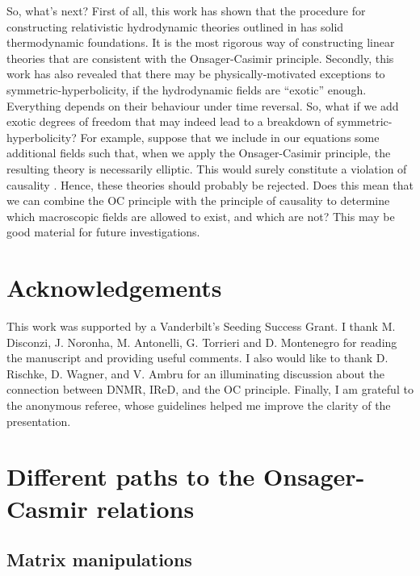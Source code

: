 \documentclass[a4paper, amsfonts, amssymb, amsmath, reprint, showkeys, nofootinbib, twoside, onecolumn,notitlepage]{revtex4-1}
\begin{document}
So, what's next? First of all, this work has shown that the procedure for constructing relativistic hydrodynamic theories outlined in \cite{GavassinoNonHydro2022} has solid thermodynamic foundations. It is the most rigorous way of constructing linear theories that are consistent with the Onsager-Casimir principle. Secondly, this work has also revealed that there may be physically-motivated exceptions to symmetric-hyperbolicity, if the hydrodynamic fields are ``exotic'' enough. Everything depends on their behaviour under time reversal. So, what if we add exotic degrees of freedom that may indeed lead to a breakdown of symmetric-hyperbolicity? For example, suppose that we include in our equations some additional fields such that, when we apply the Onsager-Casimir principle, the resulting theory is necessarily elliptic. This would surely constitute a violation of causality \cite{Rauch_book}. Hence, these theories should probably be rejected. Does this mean that we can combine the OC principle with the principle of causality to determine which macroscopic fields are allowed to exist, and which are not? This may be good material for future investigations.  





\section*{Acknowledgements}

This work was supported by a Vanderbilt's Seeding Success Grant. I thank M. Disconzi, J. Noronha, M. Antonelli, G. Torrieri and D. Montenegro for reading the manuscript and providing useful comments. I also would like to thank D. Rischke, D. Wagner, and V. Ambru for  an illuminating discussion about the connection between DNMR, IReD, and the OC principle. Finally, I am grateful to the anonymous referee, whose guidelines helped me improve the clarity of the presentation. 



\appendix

\section{Different paths to the Onsager-Casmir relations}



\subsection{Matrix manipulations}\label{camusso}
\end{document}
